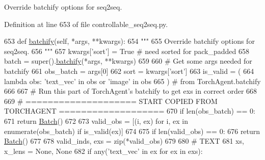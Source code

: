 \begin{DoxyVerb}Override batchify options for seq2seq.
\end{DoxyVerb}
 

Definition at line 653 of file controllable\+\_\+seq2seq.\+py.


\begin{DoxyCode}
653     \textcolor{keyword}{def }\hyperlink{namespaceparlai_1_1agents_1_1drqa_1_1utils_aca22dd97c5b6dcda2a7479c1cb22ef1e}{batchify}(self, *args, **kwargs):
654         \textcolor{stringliteral}{"""}
655 \textcolor{stringliteral}{        Override batchify options for seq2seq.}
656 \textcolor{stringliteral}{        """}
657         kwargs[\textcolor{stringliteral}{'sort'}] = \textcolor{keyword}{True}  \textcolor{comment}{# need sorted for pack\_padded}
658         batch = super().\hyperlink{namespaceparlai_1_1agents_1_1drqa_1_1utils_aca22dd97c5b6dcda2a7479c1cb22ef1e}{batchify}(*args, **kwargs)
659 
660         \textcolor{comment}{# Get some args needed for batchify}
661         obs\_batch = args[0]
662         sort = kwargs[\textcolor{stringliteral}{'sort'}]
663         is\_valid = (
664             \textcolor{keyword}{lambda} obs: \textcolor{stringliteral}{'text\_vec'} \textcolor{keywordflow}{in} obs \textcolor{keywordflow}{or} \textcolor{stringliteral}{'image'} \textcolor{keywordflow}{in} obs
665         )  \textcolor{comment}{# from TorchAgent.batchify}
666 
667         \textcolor{comment}{# Run this part of TorchAgent's batchify to get exs in correct order}
668 
669         \textcolor{comment}{# ==================== START COPIED FROM TORCHAGENT ===================}
670         \textcolor{keywordflow}{if} len(obs\_batch) == 0:
671             \textcolor{keywordflow}{return} \hyperlink{namespaceparlai_1_1agents_1_1legacy__agents_1_1seq2seq_1_1torch__agent__v1_a74cfde390a2b9861179ac0fcd59da28c}{Batch}()
672 
673         valid\_obs = [(i, ex) \textcolor{keywordflow}{for} i, ex \textcolor{keywordflow}{in} enumerate(obs\_batch) \textcolor{keywordflow}{if} is\_valid(ex)]
674 
675         \textcolor{keywordflow}{if} len(valid\_obs) == 0:
676             \textcolor{keywordflow}{return} \hyperlink{namespaceparlai_1_1agents_1_1legacy__agents_1_1seq2seq_1_1torch__agent__v1_a74cfde390a2b9861179ac0fcd59da28c}{Batch}()
677 
678         valid\_inds, exs = zip(*valid\_obs)
679 
680         \textcolor{comment}{# TEXT}
681         xs, x\_lens = \textcolor{keywordtype}{None}, \textcolor{keywordtype}{None}
682         \textcolor{keywordflow}{if} any(\textcolor{stringliteral}{'text\_vec'} \textcolor{keywordflow}{in} ex \textcolor{keywordflow}{for} ex \textcolor{keywordflow}{in} exs):

\end{DoxyCode}
